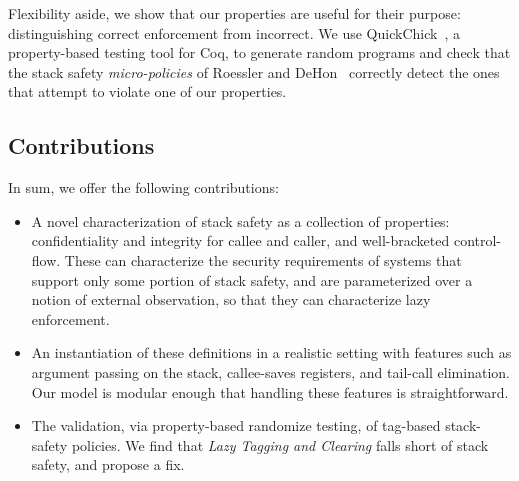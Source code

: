 \documentclass[10pt,conference]{ieeetran}%
\theoremstyle{definition}
\begin{document}

Flexibility aside, we show that our properties are useful for their purpose:
distinguishing correct enforcement from incorrect. We use
QuickChick~\cite{Denes:VSL2014,Pierce:SF4}, a property-based testing
tool for Coq, to generate random programs and check that the
stack safety {\em micro-policies} of Roessler and DeHon~\cite{DBLP:conf/sp/RoesslerD18}
correctly detect the ones that attempt to violate one of our properties.


\subsection{Contributions}

In sum, we offer the following contributions:

\begin{itemize}
\item A novel characterization of stack safety as a collection of properties:
  confidentiality and integrity for callee and caller, and well-bracketed
  control-flow. These can characterize the security requirements of systems
  that support only some portion of stack safety, and are
  parameterized over a notion of external observation, so that they can characterize
  lazy enforcement.
\item An instantiation of these definitions in a realistic
  setting with features such as argument passing
  on the stack, callee-saves registers, and tail-call elimination.
  Our model is modular enough that handling these features is straightforward.
\item The validation, via property-based randomize testing, of tag-based
  stack-safety policies. We find that \emph{Lazy Tagging and Clearing}
  falls short of stack safety, and propose a fix.
\end{itemize}
\end{document}
